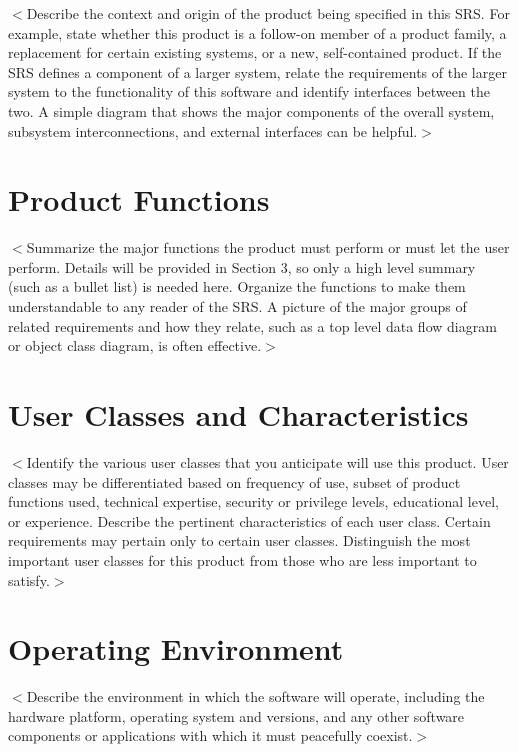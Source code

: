 \documentclass{scrreprt}
\begin{document}
$<$Describe the context and origin of the product being specified in this SRS.  
For example, state whether this product is a follow-on member of a product 
family, a replacement for certain existing systems, or a new, self-contained 
product. If the SRS defines a component of a larger system, relate the 
requirements of the larger system to the functionality of this software and 
identify interfaces between the two. A simple diagram that shows the major 
components of the overall system, subsystem interconnections, and external 
interfaces can be helpful.$>$

\section{Product Functions}
$<$Summarize the major functions the product must perform or must let the user 
perform. Details will be provided in Section 3, so only a high level summary 
(such as a bullet list) is needed here. Organize the functions to make them 
understandable to any reader of the SRS. A picture of the major groups of 
related requirements and how they relate, such as a top level data flow diagram 
or object class diagram, is often effective.$>$

\section{User Classes and Characteristics}





$<$Identify the various user classes that you anticipate will use this product.  
User classes may be differentiated based on frequency of use, subset of product 
functions used, technical expertise, security or privilege levels, educational 
level, or experience. Describe the pertinent characteristics of each user class.  
Certain requirements may pertain only to certain user classes. Distinguish the 
most important user classes for this product from those who are less important 
to satisfy.$>$





\section{Operating Environment}
$<$Describe the environment in which the software will operate, including the 
hardware platform, operating system and versions, and any other software 
components or applications with which it must peacefully coexist.$>$
\end{document}
